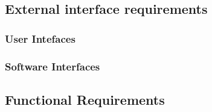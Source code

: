 \subsection{External interface requirements}
 
	\subsubsection{User Intefaces}
	\subsubsection{Software Interfaces}
	
\subsection{Functional Requirements}
\bigskip

